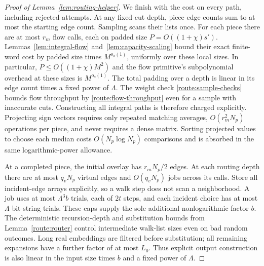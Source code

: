 \begin{proof}[Proof of Lemma~\ref{lem:routing-helper}]
We finish with the cost on every path, including rejected
attempts.  At any fixed cut depth, piece edge counts sum to at
most the starting edge count.  Sampling scans their lists once.
For each piece there are at most $r_m$ flow calls, each on padded
size $P=O((1+\chi)s')$.  Lemmas~\ref{lem:integral-flow}
and~\ref{lem:capacity-scaling} bound their exact finite-word cost
by padded size times $M^{o_a(1)}$, uniformly over these local
sizes.  In particular, $P\le O((1+\chi)M^2)$ and the flow
primitive's subpolynomial overhead at these sizes is
$M^{o_a(1)}$.  The total padding over a depth is linear in its
edge count times a fixed power of $\Lambda$.  The weight check
\eqref{route:sample-checks} bounds flow throughput by
\eqref{route:flow-throughput} even for a sample with inaccurate
cuts.  Constructing all integral paths is therefore charged
explicitly.  Projecting sign vectors requires only repeated
matching averages, $O(r_m^2N_p)$ operations per piece, and never
requires a dense matrix.  Sorting projected values to choose each
median costs $O(N_p\log N_p)$ comparisons and is absorbed in the
same logarithmic-power allowance.

At a completed piece, the initial overlay has $r_mN_p/2$ edges.
At each routing depth there are at most $q_vN_p$ virtual edges
and $O(q_vN_p)$ jobs across its calls.  Store all incident-edge
arrays explicitly, so a walk step does not scan a neighborhood.
A job uses at most $\Lambda^3b$ trials, each of $2t$ steps, and
each incident choice has at most $\Lambda$ bit-string trials.
These caps supply the sole additional nonlogarithmic factor $b$.
The deterministic recursion-depth and substitution bounds from
Lemma~\ref{route:router} control intermediate walk-list sizes
even on bad random outcomes.  Long real embeddings are filtered
before substitution; all remaining expansions have a further
factor of at most $L_0$.  Thus explicit output construction is
also linear in the input size times $b$ and a fixed power of
$\Lambda$.


\end{proof}

